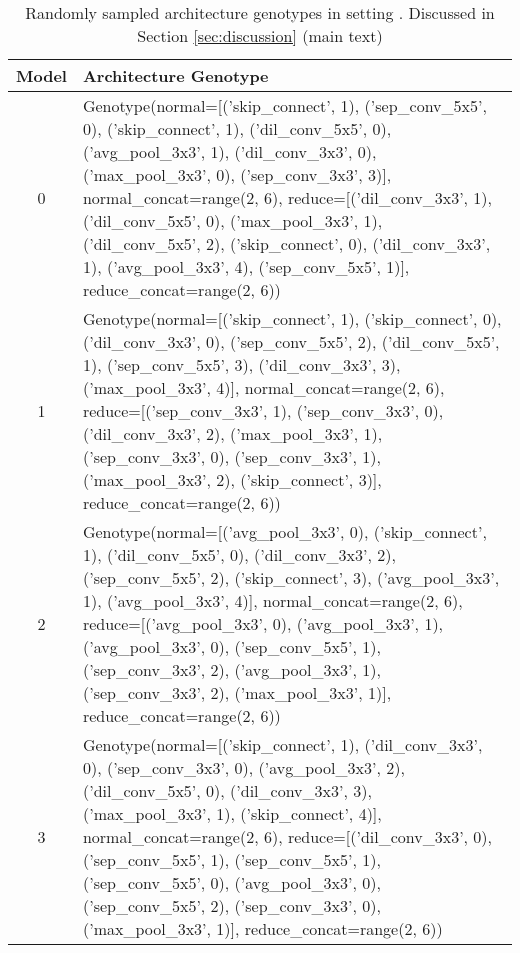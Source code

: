 \documentclass[runningheads]{llncs}
\begin{document}
\begin{table*}
	\begin{center}
		\caption{Randomly sampled architecture genotypes in  setting . Discussed in Section \ref{sec:discussion} (main text)}
		\label{tab:random-m2noflops}
		\begin{footnotesize}
			\begin{tabular}{cp{11cm}}  
				\hline
				Model & Architecture Genotype  \\
				\hline
				0 & Genotype(normal=[('skip\_connect', 1), ('sep\_conv\_5x5', 0), ('skip\_connect', 1), ('dil\_conv\_5x5', 0), ('avg\_pool\_3x3', 1), ('dil\_conv\_3x3', 0), ('max\_pool\_3x3', 0), ('sep\_conv\_3x3', 3)], normal\_concat=range(2, 6),
				reduce=[('dil\_conv\_3x3', 1), ('dil\_conv\_5x5', 0), ('max\_pool\_3x3', 1), ('dil\_conv\_5x5', 2), ('skip\_connect', 0), ('dil\_conv\_3x3', 1), ('avg\_pool\_3x3', 4), ('sep\_conv\_5x5', 1)], reduce\_concat=range(2, 6))
				
				\\
				1 & Genotype(normal=[('skip\_connect', 1), ('skip\_connect', 0), ('dil\_conv\_3x3', 0), ('sep\_conv\_5x5', 2), ('dil\_conv\_5x5', 1), ('sep\_conv\_5x5', 3), ('dil\_conv\_3x3', 3), ('max\_pool\_3x3', 4)], normal\_concat=range(2, 6),
				reduce=[('sep\_conv\_3x3', 1), ('sep\_conv\_3x3', 0), ('dil\_conv\_3x3', 2), ('max\_pool\_3x3', 1), ('sep\_conv\_3x3', 0), ('sep\_conv\_3x3', 1), ('max\_pool\_3x3', 2), ('skip\_connect', 3)], reduce\_concat=range(2, 6))
				
				\\
				2 &  Genotype(normal=[('avg\_pool\_3x3', 0), ('skip\_connect', 1), ('dil\_conv\_5x5', 0), ('dil\_conv\_3x3', 2), ('sep\_conv\_5x5', 2), ('skip\_connect', 3), ('avg\_pool\_3x3', 1), ('avg\_pool\_3x3', 4)], normal\_concat=range(2, 6),
				reduce=[('avg\_pool\_3x3', 0), ('avg\_pool\_3x3', 1), ('avg\_pool\_3x3', 0), ('sep\_conv\_5x5', 1), ('sep\_conv\_3x3', 2), ('avg\_pool\_3x3', 1), ('sep\_conv\_3x3', 2), ('max\_pool\_3x3', 1)], reduce\_concat=range(2, 6))
				
				\\
				3& Genotype(normal=[('skip\_connect', 1), ('dil\_conv\_3x3', 0), ('sep\_conv\_3x3', 0), ('avg\_pool\_3x3', 2), ('dil\_conv\_5x5', 0), ('dil\_conv\_3x3', 3), ('max\_pool\_3x3', 1), ('skip\_connect', 4)], normal\_concat=range(2, 6),
				reduce=[('dil\_conv\_3x3', 0), ('sep\_conv\_5x5', 1), ('sep\_conv\_5x5', 1), ('sep\_conv\_5x5', 0), ('avg\_pool\_3x3', 0), ('sep\_conv\_5x5', 2), ('sep\_conv\_3x3', 0), ('max\_pool\_3x3', 1)], reduce\_concat=range(2, 6))
				

\end{tabular}
\end{footnotesize}
\end{center}
\end{table*}
\end{document}
